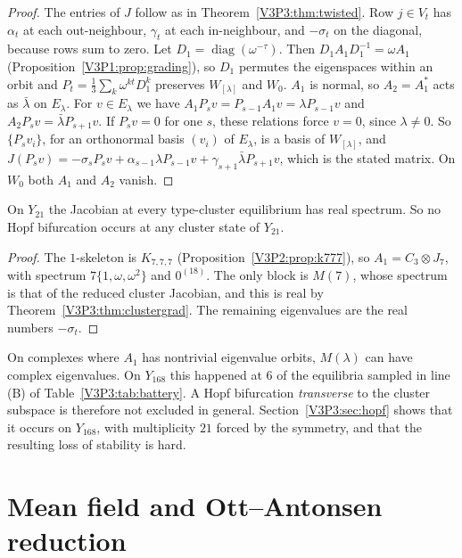 \begin{proof}
The entries of $J$ follow as in Theorem~\ref{V3P3:thm:twisted}. Row $j\in V_t$ has $\alpha_t$ at
each out-neighbour, $\gamma_t$ at each in-neighbour, and $-\sigma_t$ on the diagonal, because
rows sum to zero. Let $D_1=\operatorname{diag}(\omega^{-\tau})$. Then $D_1A_1D_1^{-1}=\omega
A_1$ (Proposition~\ref{V3P1:prop:grading}), so $D_1$ permutes the eigenspaces within an orbit
and $P_t=\frac13\sum_k\omega^{kt}D_1^{k}$ preserves $W_{[\lambda]}$ and $W_0$. $A_1$ is
normal, so $A_2=A_1^{*}$ acts as $\bar\lambda$ on $E_\lambda$. For $v\in E_\lambda$ we have
$A_1P_sv=P_{s-1}A_1v=\lambda P_{s-1}v$ and $A_2P_sv=\bar\lambda P_{s+1}v$. If $P_sv=0$ for one
$s$, these relations force $v=0$, since $\lambda\neq0$. So $\{P_sv_i\}$, for an orthonormal
basis $(v_i)$ of $E_\lambda$, is a basis of $W_{[\lambda]}$, and
$J(P_sv)=-\sigma_sP_sv+\alpha_{s-1}\lambda P_{s-1}v+\gamma_{s+1}\bar\lambda P_{s+1}v$, which
is the stated matrix. On $W_0$ both $A_1$ and $A_2$ vanish.
\end{proof}

\begin{corollary}\label{V3P3:cor:Y21real}
On $Y_{21}$ the Jacobian at every type-cluster equilibrium has real spectrum. So no Hopf
bifurcation occurs at any cluster state of $Y_{21}$.
\end{corollary}

\begin{proof}
The $1$-skeleton is $K_{7,7,7}$ (Proposition~\ref{V3P2:prop:k777}), so
$A_1=C_3\otimes J_7$, with spectrum $7\{1,\omega,\omega^{2}\}$ and $0^{(18)}$. The only block is
$M(7)$, whose spectrum is that of the reduced cluster Jacobian, and this is real by
Theorem~\ref{V3P3:thm:clustergrad}. The remaining eigenvalues are the real numbers $-\sigma_t$.
\end{proof}

On complexes where $A_1$ has nontrivial eigenvalue orbits, $M(\lambda)$ can have complex
eigenvalues. On $Y_{168}$ this happened at $6$ of the equilibria sampled in line (B) of
Table~\ref{V3P3:tab:battery}. A Hopf bifurcation \emph{transverse} to the cluster subspace is
therefore not excluded in general. Section~\ref{V3P3:sec:hopf} shows that it occurs on $Y_{168}$, with
multiplicity $21$ forced by the symmetry, and that the resulting loss of stability is hard.

\section{Mean field and Ott--Antonsen reduction}\label{V3P3:sec:oa}

